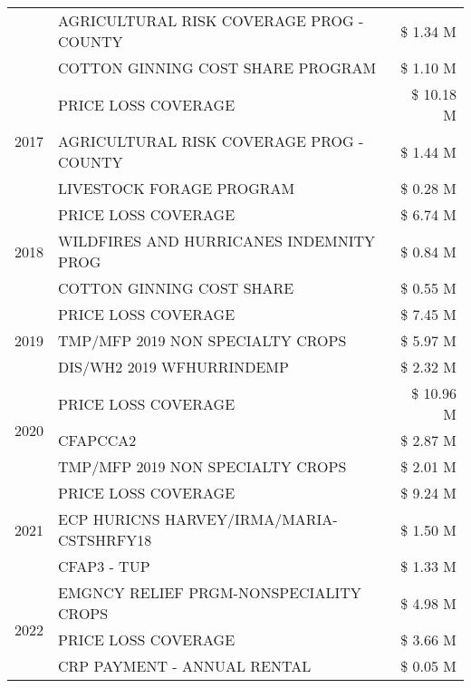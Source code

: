 \begin{tabular}{llr}
 & AGRICULTURAL RISK COVERAGE PROG - COUNTY & \$ 1.34 M \\
 & COTTON GINNING COST SHARE PROGRAM & \$ 1.10 M \\
\cline{1-3}
\multirow[t]{3}{*}{2017} & PRICE LOSS COVERAGE & \$ 10.18 M \\
 & AGRICULTURAL RISK COVERAGE PROG - COUNTY & \$ 1.44 M \\
 & LIVESTOCK FORAGE PROGRAM & \$ 0.28 M \\
\cline{1-3}
\multirow[t]{3}{*}{2018} & PRICE LOSS COVERAGE & \$ 6.74 M \\
 & WILDFIRES AND HURRICANES INDEMNITY PROG & \$ 0.84 M \\
 & COTTON GINNING COST SHARE & \$ 0.55 M \\
\cline{1-3}
\multirow[t]{3}{*}{2019} & PRICE LOSS COVERAGE & \$ 7.45 M \\
 & TMP/MFP 2019 NON SPECIALTY CROPS & \$ 5.97 M \\
 & DIS/WH2 2019 WFHURRINDEMP & \$ 2.32 M \\
\cline{1-3}
\multirow[t]{3}{*}{2020} & PRICE LOSS COVERAGE & \$ 10.96 M \\
 & CFAPCCA2 & \$ 2.87 M \\
 & TMP/MFP 2019 NON SPECIALTY CROPS & \$ 2.01 M \\
\cline{1-3}
\multirow[t]{3}{*}{2021} & PRICE LOSS COVERAGE & \$ 9.24 M \\
 & ECP HURICNS HARVEY/IRMA/MARIA-CSTSHRFY18 & \$ 1.50 M \\
 & CFAP3 - TUP & \$ 1.33 M \\
\cline{1-3}
\multirow[t]{3}{*}{2022} & EMGNCY RELIEF PRGM-NONSPECIALITY CROPS & \$ 4.98 M \\
 & PRICE LOSS COVERAGE & \$ 3.66 M \\
 & CRP PAYMENT - ANNUAL RENTAL & \$ 0.05 M \\
\cline{1-3}
\bottomrule
\end{tabular}
